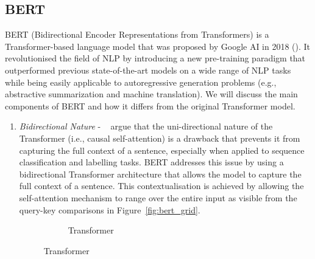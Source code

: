 \subsection{BERT}\label{subsec:bert}
BERT (Bidirectional Encoder Representations from Transformers) is a Transformer-based language model that was proposed by Google AI in 2018 (\cite{devlin-etal-2019-bert}).
It revolutionised the field of NLP by introducing a new pre-training paradigm that outperformed previous state-of-the-art models on a wide range of NLP tasks while being easily applicable to autoregressive generation problems (e.g., abstractive summarization and machine translation).
We will discuss the main components of BERT and how it differs from the original Transformer model.
\begin{enumerate}
    \item \emph{Bidirectional Nature} - ~\cite{jurafsky2000} argue that the uni-directional nature of the Transformer (i.e., causal self-attention) is a drawback that
    prevents it from capturing the full context of a sentence, especially when applied to sequence classification and labelling tasks.
    BERT addresses this issue by using a bidirectional Transformer architecture that allows the model to capture the full context of a sentence.
    This contextualisation is achieved by allowing the self-attention mechanism to range over the entire input as visible from the query-key comparisons in Figure~\ref{fig:bert_grid}.
    \begin{figure}[h]
        \centering
        \begin{subfigure}{0.45\textwidth}
            \centering
            \caption{Transformer}
            \label{fig:causal_grid}

\end{subfigure}
\end{figure}
\end{enumerate}
